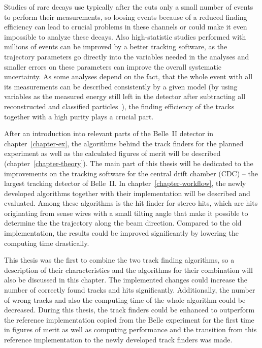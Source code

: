 Studies of rare decays use typically after the cuts only a small number of events~\cite{lutz} to perform their measurements, so loosing events because of a reduced finding efficiency can lead to crucial problems in these channels or could make it even impossible to analyze these decays. Also high-statistic studies performed with millions of events can be improved by a better tracking software, as the trajectory parameters go directly into the variables needed in the analyses and smaller errors on these parameters can improve the overall systematic uncertainty. As some analyses depend on the fact, that the whole event with all its measurements can be described consistently by a given model (by using variables as the measured energy still left in the detector after subtracting all reconstructed and classified particles~\cite{christian_phd}), the finding efficiency of the tracks together with a high purity plays a crucial part.

After an introduction into relevant parts of the Belle~II detector in chapter~\ref{chapter-ex}, the algorithms behind the track finders for the planned experiment as well as the calculated figures of merit will be described (chapter~\ref{chapter-theory}). The main part of this thesis will be dedicated to the improvements on the tracking software for the central drift chamber (CDC) -- the largest tracking detector of Belle~II. In chapter~\ref{chapter-workflow}, the newly developed algorithms together with their implementation will be described and evaluated. Among these algorithms is the hit finder for stereo hits, which are hits originating from sense wires with a small tilting angle that make it possible to determine the the trajectory along the beam direction. Compared to the old implementation, the results could be improved significantly by lowering the computing time drastically.

This thesis was the first to combine the two track finding algorithms, so a description of their characteristics and the algorithms for their combination will also be discussed in this chapter. The implemented changes could increase the number of correctly found tracks and hits significantly. Additionally, the number of wrong tracks and also the computing time of the whole algorithm could be decreased. During this thesis, the track finders could be enhanced to outperform the reference implementation copied from the Belle experiment for the first time in figures of merit as well as computing performance and the transition from this reference implementation to the newly developed track finders was made.

